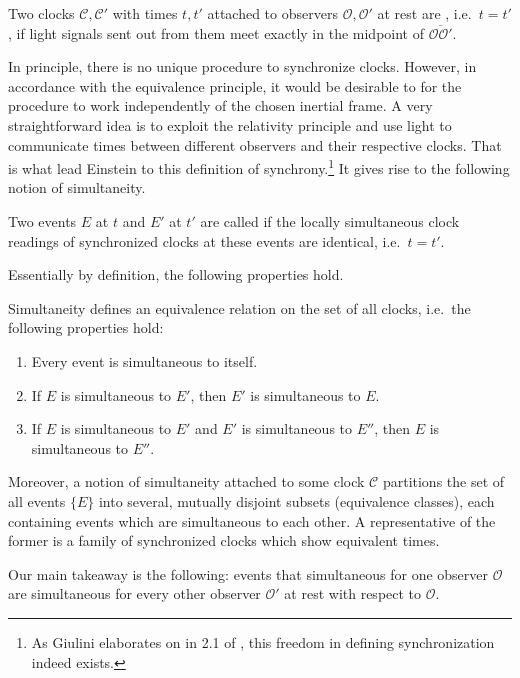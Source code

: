 \begin{defi}\label{defi:einstein_synchrony}
Two clocks $\mathcal{C}, \mathcal{C}'$ with times $t, t'$ attached to observers $\mathcal{O}, \mathcal{O}'$ at rest are , i.e.~$t = t'$, if light signals sent out from them meet exactly in the midpoint of $\overline{\mathcal{O} \mathcal{O}'}$.
\end{defi}
In principle, there is no unique procedure to synchronize clocks. However, in accordance with the equivalence principle, it would be desirable to for the procedure to work independently of the chosen inertial frame. A very straightforward idea is to exploit the relativity principle and use light to communicate times between different observers and their respective clocks. That is what lead Einstein to this definition of synchrony.\footnote{As Giulini elaborates on in 2.1 of \cite{giulini_srt}, this freedom in defining synchronization indeed exists.} It gives rise to the following notion of simultaneity.
\begin{defi}[Simultaneity]\label{defi:simultaneity}
Two events $E$ at $t$ and $E'$ at $t'$ are called  if the locally simultaneous clock readings of synchronized clocks at these events are identical, i.e.~$t = t'$.
\end{defi}

Essentially by definition, the following properties hold.
\begin{prop}
Simultaneity defines an equivalence relation on the set of all clocks, i.e.~the following properties hold:
\begin{enumerate}
\item Every event is simultaneous to itself.

\item If $E$ is simultaneous to $E'$, then $E'$ is simultaneous to $E$.

\item If $E$ is simultaneous to $E'$ and $E'$ is simultaneous to $E''$, then $E$ is simultaneous to $E''$.
\end{enumerate}

Moreover, a notion of simultaneity attached to some clock $\mathcal{C}$ partitions the set of all events $\{E\}$ into several, mutually disjoint subsets (equivalence classes), each containing events which are simultaneous to each other. A representative of the former is a family of synchronized clocks which show equivalent times.
\end{prop}
Our main takeaway is the following: events that simultaneous for one observer $\mathcal{O}$ are simultaneous for every other observer $\mathcal{O}'$ at rest with respect to $\mathcal{O}$.


